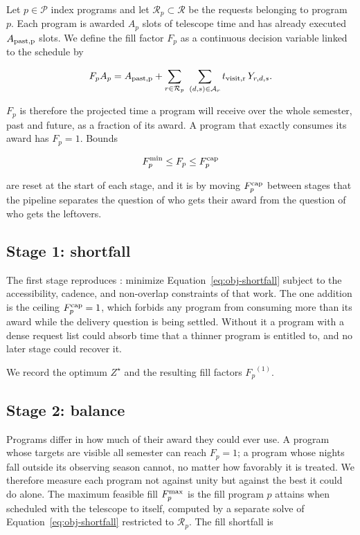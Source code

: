 \documentclass[twocolumn,linenumbers]{aastex63}
\def\Pcal{\mathcal{P}}
\def\Rcal{\mathcal{R}}
\newcommand{\isr}[2]{\ensuremath{#1_{\rm #2}}\xspace}
\newcommand{\Fp}{\ensuremath{F_p}\xspace}
\newcommand{\maff}{\ensuremath{F^{\rm max}_p}\xspace}
\newcommand{\minfill}{\ensuremath{F^{\rm min}_p}\xspace}
\newcommand{\maxfill}{\ensuremath{F^{\rm cap}_p}\xspace}
\newcommand{\Zstar}{\ensuremath{Z^{\star}}\xspace}
\begin{document}
Let $p \in \Pcal$ index programs and let $\Rcal_p \subset \Rcal$ be the requests
belonging to program $p$. Each program is awarded $A_p$ slots of telescope time
and has already executed $\isr{A}{past,p}$ slots. We define the fill factor \Fp
as a continuous decision variable linked to the schedule by

\begin{equation}
  \Fp A_p = \isr{A}{past,p} + \sum_{r \in \Rcal_p} \ \sum_{(d,s) \in \mathcal{A}_r}
  \isr{t}{visit,r} \, Y_{r,d,s} .
  \label{eq:fill-link}
\end{equation}

\noindent \Fp is therefore the projected time a program will receive over the
whole semester, past and future, as a fraction of its award. A program that
exactly consumes its award has $\Fp = 1$. Bounds

\begin{equation}
  \minfill \le \Fp \le \maxfill
  \label{eq:fill-bounds}
\end{equation}

\noindent are reset at the start of each stage, and it is by moving \maxfill
between stages that the pipeline separates the question of who gets their
award from the question of who gets the leftovers.

\subsection{Stage 1: shortfall}
\label{sec:stages:shortfall}

The first stage reproduces \citet{Lubin2025}: minimize
Equation~\ref{eq:obj-shortfall} subject to the accessibility, cadence, and
non-overlap constraints of that work. The one addition is the ceiling
$\maxfill = 1$, which forbids any program from consuming more than its award
while the delivery question is being settled. Without it a program with a dense
request list could absorb time that a thinner program is entitled to, and no
later stage could recover it.

We record the optimum \Zstar and the resulting fill factors $\Fp^{(1)}$.

\subsection{Stage 2: balance}
\label{sec:stages:balance}

Programs differ in how much of their award they could ever use. A program whose
targets are visible all semester can reach $\Fp = 1$; a program whose nights
fall outside its observing season cannot, no matter how favorably it is
treated. We therefore measure each program not against unity but against the
best it could do alone. The maximum feasible fill \maff is the fill program $p$
attains when scheduled with the telescope to itself, computed by a separate
solve of Equation~\ref{eq:obj-shortfall} restricted to $\Rcal_p$. The fill
shortfall is
\end{document}
